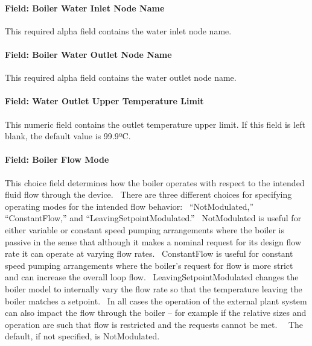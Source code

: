 \paragraph{Field: Boiler Water Inlet Node Name}\label{field-boiler-water-inlet-node-name}

This required alpha field contains the water inlet node name.

\paragraph{Field: Boiler Water Outlet Node Name}\label{field-boiler-water-outlet-node-name}

This required alpha field contains the water outlet node name.

\paragraph{Field: Water Outlet Upper Temperature Limit}\label{field-water-outlet-upper-temperature-limit-000}

This numeric field contains the outlet temperature upper limit. If this field is left blank, the default value is 99.9ºC.

\paragraph{Field: Boiler Flow Mode}\label{field-boiler-flow-mode}

This choice field determines how the boiler operates with respect to the intended fluid flow through the device.~ There are three different choices for specifying operating modes for the intended flow behavior:~ ``NotModulated,'' ``ConstantFlow,'' and ``LeavingSetpointModulated.''~ NotModulated is useful for either variable or constant speed pumping arrangements where the boiler is passive in the sense that although it makes a nominal request for its design flow rate it can operate at varying flow rates.~ ConstantFlow is useful for constant speed pumping arrangements where the boiler's request for flow is more strict and can increase the overall loop flow.~ LeavingSetpointModulated changes the boiler model to internally vary the flow rate so that the temperature leaving the boiler matches a setpoint.~ In all cases the operation of the external plant system can also impact the flow through the boiler -- for example if the relative sizes and operation are such that flow is restricted and the requests cannot be met.~~ The default, if not specified, is NotModulated.

